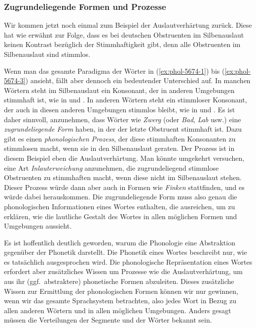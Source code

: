 \subsubsection{Zugrundeliegende Formen und Prozesse}

Wir kommen jetzt noch einmal zum Beispiel der Auslautverhärtung zurück.
Diese hat wie erwähnt zur Folge, dass es bei deutschen Obstruenten im Silbenauslaut keinen Kontrast bezüglich der Stimmhaftigkeit gibt, denn alle Obstruenten im Silbenauslaut sind stimmlos.

Wenn man das gesamte Paradigma der Wörter in (\ref{ex:phol-5674-1}) bis (\ref{ex:phol-5674-3}) ansieht, fällt aber dennoch ein bedeutender Unterschied auf.
In manchen Wörtern steht im Silbenauslaut ein Konsonant, der in anderen Umgebungen stimmhaft ist, wie in \textipa{[\t{ts}v\t{E@}k]} und \textipa{[\t{ts}v\t{E@}g@s]}.
In anderen Wörtern steht ein stimmloser Konsonant, der auch in diesen anderen Umgebungen stimmlos bleibt, wie in \textipa{[fINk]} und \textipa{[fINk@n]}.
Es ist daher sinnvoll, anzunehmen, dass Wörter wie \textit{Zwerg} (oder \textit{Bad}, \textit{Lab} usw.) eine \textit{zugrundeliegende Form} haben, in der der letzte Obstruent stimmhaft ist.
Dazu gibt es einen \textit{phonologischen Prozess}, der diese stimmhaften Konsonanten zu stimmlosen macht, wenn sie in den Silbenauslaut geraten.%
Der Prozess ist in diesem Beispiel eben die Auslautverhärtung.
Man könnte umgekehrt versuchen, eine Art \textit{Inlauterweichung} anzunehmen, die zugrundeliegend stimmlose Obstruenten zu stimmhaften macht, wenn diese nicht im Silbenauslaut stehen.
Dieser Prozess würde dann aber auch in Formen wie \textit{Finken} stattfinden, und es würde\Ast\textipa{[fIN@n]} dabei herauskommen.
Die zugrundeliegende Form muss also genau die phonologischen Informationen eines Wortes enthalten, die ausreichen, um zu erklären, wie die lautliche Gestalt des Wortes in allen möglichen Formen und Umgebungen aussieht.


Es ist hoffentlich deutlich geworden, warum die Phonologie eine Abstraktion gegenüber der Phonetik darstellt.
Die Phonetik eines Wortes beschreibt nur, wie es tatsächlich ausgesprochen wird.
Die phonologische Repräsentation eines Wortes erfordert aber zusätzliches Wissen um Prozesse wie die Auslautverhärtung, um aus ihr (ggf.\ abstraktere) phonetische Formen abzuleiten.
Dieses zusätzliche Wissen zur Ermittlung der phonologischen Formen können wir nur gewinnen, wenn wir das gesamte Sprachsystem betrachten, also jedes Wort in Bezug zu allen anderen Wörtern und in allen möglichen Umgebungen.
Anders gesagt müssen die Verteilungen der Segmente und der Wörter bekannt sein.

